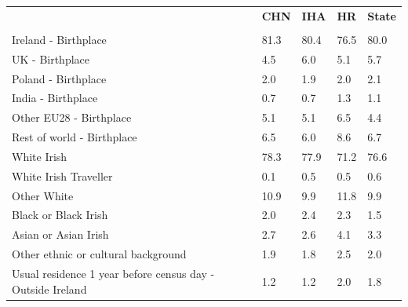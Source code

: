 \documentclass{article}
\begin{document}
\pagebreak
\begin{table}[h]	
\centering
		\begin{tabular}{KTTTT}
  \hline
& \textbf{CHN} & \textbf{IHA} & \textbf{HR}& \textbf{State}\\ 
  \hline
    \\ 
    \hline
Ireland - Birthplace & 81.3& 80.4& 76.5& 80.0\\
UK - Birthplace & 4.5& 6.0& 5.1& 5.7\\
Poland - Birthplace & 2.0& 1.9& 2.0& 2.1\\
India - Birthplace & 0.7& 0.7& 1.3& 1.1\\
Other EU28 - Birthplace & 5.1& 5.1& 6.5& 4.4\\
Rest of world - Birthplace & 6.5& 6.0& 8.6& 6.7\\
    \hline
White Irish & 78.3& 77.9& 71.2& 76.6\\
White Irish Traveller & 0.1& 0.5& 0.5& 0.6\\
Other White & 10.9&  9.9& 11.8&  9.9\\
Black or Black Irish & 2.0& 2.4& 2.3& 1.5\\
Asian or Asian Irish & 2.7& 2.6& 4.1& 3.3\\
Other ethnic or cultural background & 1.9& 1.8& 2.5& 2.0\\
    \hline
Usual residence 1 year before census day - Outside Ireland & 1.2& 1.2& 2.0& 1.8\\


\end{tabular}
\end{table}
\end{document}

